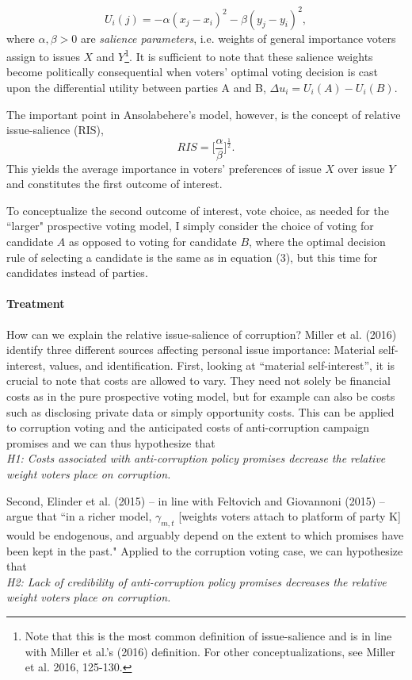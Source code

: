 \documentclass[11pt]{article}
\begin{document}
\begin{equation}
U_i(j) = - \alpha(x_j - x_i)^2 - \beta(y_j - y_i)^2,
\end{equation}
where $\alpha, \beta > 0$ are \textit{salience parameters}, i.e. weights of general importance voters assign to issues $X$ and $Y$\footnote{Note that this is the most common definition of issue-salience and is in line with Miller et al.'s (2016) definition. For other conceptualizations, see Miller et al. 2016, 125-130.}. It is sufficient to note that these salience weights become politically consequential when voters' optimal voting decision is cast upon the differential utility between parties A and B, $\Delta u_i = U_i(A) - U_i(B)$.

The important point in Ansolabehere's model, however, is the concept of relative issue-salience (RIS),
\begin{equation}
RIS = \bigg[\frac{\alpha}{\beta}\bigg]^\frac{1}{2}.
\end{equation} 
This yields the average importance in voters' preferences of issue $X$ over issue $Y$ and constitutes the first outcome of interest.

To conceptualize the second outcome of interest, vote choice, as needed for the “larger" prospective voting model, I simply consider the choice of voting for candidate $A$ as opposed to voting for candidate $B$, where the optimal decision rule of selecting a candidate is the same as in equation (3), but this time for candidates instead of parties.

\paragraph{Treatment}
How can we explain the relative issue-salience of corruption? Miller et al. (2016) identify three different sources affecting personal issue importance: Material self-interest, values, and identification. First, looking at ``material self-interest'', it is crucial to note that costs are allowed to vary. They need not solely be financial costs as in the pure prospective voting model, but for example can also be costs such as disclosing private data or simply opportunity costs. This can be applied to corruption voting and the anticipated costs of anti-corruption campaign promises and we can thus hypothesize that \\
\textit{H1: Costs associated with anti-corruption policy promises decrease the relative weight voters place on corruption.}

Second, Elinder et al. (2015) -- in line with Feltovich and Giovannoni (2015) -- argue that “in a richer model, $\gamma_{m, t}$ [weights voters attach to platform of party K] would be endogenous, and arguably depend on the extent to which promises have been kept in the past." Applied to the corruption voting case, we can hypothesize that \\
\textit{H2: Lack of credibility of anti-corruption policy promises decreases the relative weight voters place on corruption.}
\end{document}
